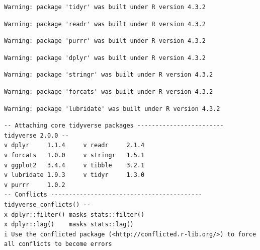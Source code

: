 \documentclass[
  11pt,
  a4paper,
  DIV=11,
  numbers=noendperiod]{scrartcl}
\begin{document}
\begin{verbatim}
Warning: package 'tidyr' was built under R version 4.3.2
\end{verbatim}

\begin{verbatim}
Warning: package 'readr' was built under R version 4.3.2
\end{verbatim}

\begin{verbatim}
Warning: package 'purrr' was built under R version 4.3.2
\end{verbatim}

\begin{verbatim}
Warning: package 'dplyr' was built under R version 4.3.2
\end{verbatim}

\begin{verbatim}
Warning: package 'stringr' was built under R version 4.3.2
\end{verbatim}

\begin{verbatim}
Warning: package 'forcats' was built under R version 4.3.2
\end{verbatim}

\begin{verbatim}
Warning: package 'lubridate' was built under R version 4.3.2
\end{verbatim}

\begin{verbatim}
-- Attaching core tidyverse packages ------------------------ tidyverse 2.0.0 --
v dplyr     1.1.4     v readr     2.1.4
v forcats   1.0.0     v stringr   1.5.1
v ggplot2   3.4.4     v tibble    3.2.1
v lubridate 1.9.3     v tidyr     1.3.0
v purrr     1.0.2     
-- Conflicts ------------------------------------------ tidyverse_conflicts() --
x dplyr::filter() masks stats::filter()
x dplyr::lag()    masks stats::lag()
i Use the conflicted package (<http://conflicted.r-lib.org/>) to force all conflicts to become errors
\end{verbatim}
\end{document}
